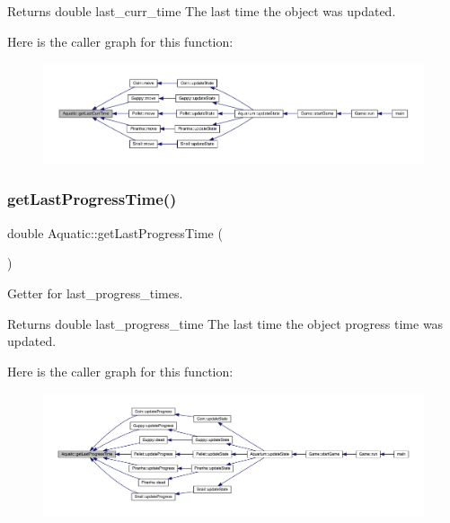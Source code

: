 \begin{DoxyReturn}{Returns}
double last\+\_\+curr\+\_\+time The last time the object was updated. 
\end{DoxyReturn}
Here is the caller graph for this function\+:\nopagebreak
\begin{figure}[H]
\begin{center}
\leavevmode
\includegraphics[width=350pt]{class_aquatic_aba770b1c9ca9481712a6963e7e8e2919_icgraph}
\end{center}
\end{figure}
\mbox{\label{class_aquatic_a60e1c0f173d0b37adce3cdd3d92efea0}} 
\subsubsection{\texorpdfstring{get\+Last\+Progress\+Time()}{getLastProgressTime()}}
{\footnotesize\ttfamily double Aquatic\+::get\+Last\+Progress\+Time (\begin{DoxyParamCaption}{ }\end{DoxyParamCaption})}



Getter for last\+\_\+progress\+\_\+times. 

\begin{DoxyReturn}{Returns}
double last\+\_\+progress\+\_\+time The last time the object progress time was updated. 
\end{DoxyReturn}
Here is the caller graph for this function\+:\nopagebreak
\begin{figure}[H]
\begin{center}
\leavevmode
\includegraphics[width=350pt]{class_aquatic_a60e1c0f173d0b37adce3cdd3d92efea0_icgraph}
\end{center}
\end{figure}
\mbox{\label{class_aquatic_a4153178bfefdc57cbcd05fe44054dac9}} 

